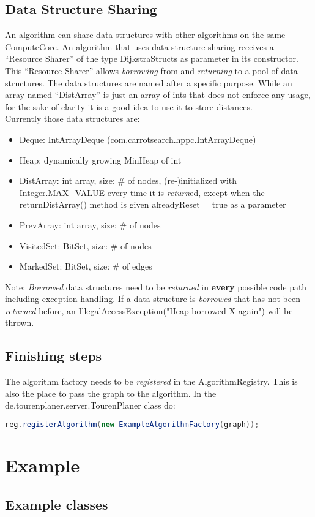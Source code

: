 \documentclass[ngerman,titlepage,parskip=true]{scrartcl}
\begin{document}
  \subsection{Data Structure Sharing}
  An algorithm can share data structures with other algorithms on the same ComputeCore. An algorithm that uses data structure sharing receives a ``Resource Sharer'' of the type DijkstraStructs as parameter in its constructor. This ``Resource Sharer'' allows \textit{borrowing} from and \textit{returning} to a pool of data structures. The data structures are named after a specific purpose. While an array named ``DistArray'' is just an array of ints that does not enforce any usage, for the sake of clarity it is a good idea to use it to store distances.\\
  Currently those data structures are:
  \begin{itemize}
    \item Deque: IntArrayDeque (com.carrotsearch.hppc.IntArrayDeque)
    \item Heap: dynamically growing MinHeap of int
    \item DistArray: int array, size: \# of nodes, (re-)initialized with Integer.MAX\_VALUE every time it is \textit{return}ed, except when the returnDistArray() method is given alreadyReset = true as a parameter
    \item PrevArray: int array, size: \# of nodes
    \item VisitedSet: BitSet, size: \# of nodes
    \item MarkedSet: BitSet, size: \# of edges
  \end{itemize}
  Note: \textit{Borrowed} data structures need to be \textit{returned} in \textbf{every} possible code path including exception handling. If a data structure is \textit{borrowed} that has not been \textit{returned} before, an IllegalAccessException("Heap borrowed X again") will be thrown.

  \subsection{Finishing steps}
  The algorithm factory needs to be \textit{registered} in the AlgorithmRegistry. This is also the place to pass the graph to the algorithm.
  In the de.tourenplaner.server.TourenPlaner class do:
  \begin{lstlisting}[language=java,caption=register your algorithm factory]
          reg.registerAlgorithm(new ExampleAlgorithmFactory(graph));
  \end{lstlisting}
  
  \section{Example}
	 \subsection{Example classes}
	 
	 
\end{document}
